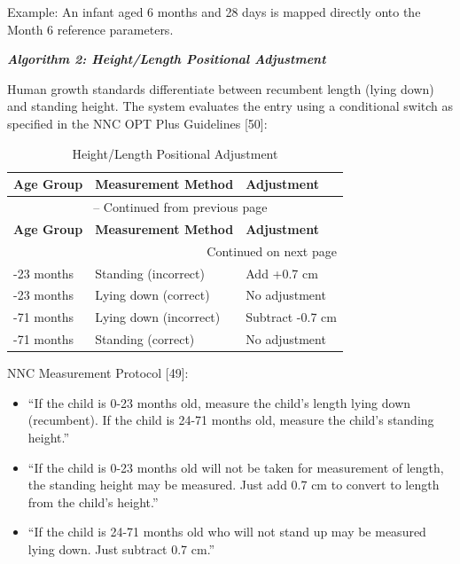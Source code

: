 \documentclass[12pt, a4paper]{report}
\begin{document}
Example: An infant aged 6 months and 28 days is mapped directly onto the Month 6 reference parameters.

\noindent \textbf{\textit{Algorithm 2: Height/Length Positional Adjustment}}

Human growth standards differentiate between recumbent length (lying down) and standing height. The system evaluates the entry using a conditional switch as specified in the NNC OPT Plus Guidelines [50]:

\vspace{0.3cm}
\begin{longtable}{p{3cm} p{5cm} p{5cm}}
    \caption{Height/Length Positional Adjustment} \label{tab:positional_adj} \\
    \toprule
    \textbf{Age Group} & \textbf{Measurement Method} & \textbf{Adjustment} \\
    \midrule
    \endfirsthead
    \multicolumn{3}{c}{{\tablename\ \thetable{} -- Continued from previous page}} \\
    \toprule
    \textbf{Age Group} & \textbf{Measurement Method} & \textbf{Adjustment} \\
    \midrule
    \endhead
    \midrule
    \multicolumn{3}{r}{{Continued on next page}} \\
    \endfoot
    \bottomrule
    \endlastfoot
    0-23 months & Standing (incorrect) & Add +0.7 cm \\
    \addlinespace
    0-23 months & Lying down (correct) & No adjustment \\
    \addlinespace
    24-71 months & Lying down (incorrect) & Subtract -0.7 cm \\
    \addlinespace
    24-71 months & Standing (correct) & No adjustment \\
\end{longtable}
\vspace{0.3cm}

NNC Measurement Protocol [49]:
\begin{itemize}
    \item ``If the child is 0-23 months old, measure the child's length lying down (recumbent). If the child is 24-71 months old, measure the child's standing height.''
    \item ``If the child is 0-23 months old will not be taken for measurement of length, the standing height may be measured. Just add 0.7 cm to convert to length from the child's height.''
    \item ``If the child is 24-71 months old who will not stand up may be measured lying down. Just subtract 0.7 cm.''
\end{itemize}
\end{document}

